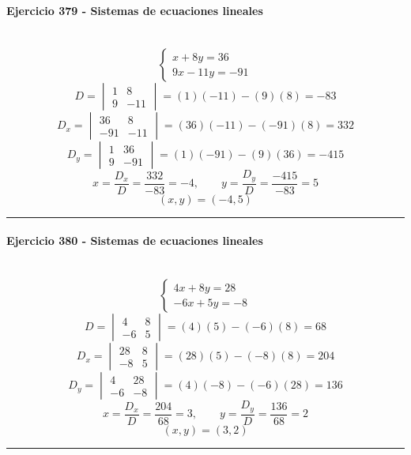 \documentclass[10pt,a4paper]{article}
\newcommand{\res}[1]{\paragraph{#1}\mbox{}\\[-1.2em]}
\begin{document}
\res{Ejercicio 379 - Sistemas de ecuaciones lineales}
\[ \begin{cases}x + 8 y=36\\9 x - 11 y=-91\end{cases} \]
\[ D=\begin{vmatrix}1&8\\9&-11\end{vmatrix}=(1)(-11)-(9)(8)=-83 \]
\[ D_x=\begin{vmatrix}36&8\\-91&-11\end{vmatrix}=(36)(-11)-(-91)(8)=332 \]
\[ D_y=\begin{vmatrix}1&36\\9&-91\end{vmatrix}=(1)(-91)-(9)(36)=-415 \]
\[ x=\frac{D_x}{D}=\frac{332}{-83}=-4,\qquad y=\frac{D_y}{D}=\frac{-415}{-83}=5 \]
\[ \boxed{(x,y)=(-4,5)} \]
\vspace{1mm}\hrule\vspace{2mm}
\res{Ejercicio 380 - Sistemas de ecuaciones lineales}
\[ \begin{cases}4 x + 8 y=28\\- 6 x + 5 y=-8\end{cases} \]
\[ D=\begin{vmatrix}4&8\\-6&5\end{vmatrix}=(4)(5)-(-6)(8)=68 \]
\[ D_x=\begin{vmatrix}28&8\\-8&5\end{vmatrix}=(28)(5)-(-8)(8)=204 \]
\[ D_y=\begin{vmatrix}4&28\\-6&-8\end{vmatrix}=(4)(-8)-(-6)(28)=136 \]
\[ x=\frac{D_x}{D}=\frac{204}{68}=3,\qquad y=\frac{D_y}{D}=\frac{136}{68}=2 \]
\[ \boxed{(x,y)=(3,2)} \]
\vspace{1mm}\hrule\vspace{2mm}
\end{document}
